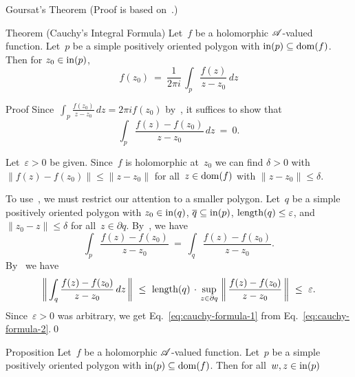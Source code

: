 \documentclass[a]{subfiles}
\begin{document}
\begin{parsec}
\begin{point}[goursat]{Goursat's Theorem}
(Proof is based on~\cite{moore1900}.)
\end{point}%
\begin{point}{Theorem (Cauchy's Integral Formula)}%
Let~$f$ be a holomorphic $\mathscr{A}$-valued function.
Let~$p$ be a simple positively oriented 
polygon with $\operatorname{in}(p)\subseteq\operatorname{dom}(f)$.
Then for $z_0\in \operatorname{in}(p)$,
\begin{equation*}
f(z_0)\ = \ \frac{1}{2\pi i}\,\int_p \frac{f(z)}{z-z_0}\,dz
\end{equation*}
\begin{point}{Proof}%
Since~$\int_p \frac{f(z_0)}{z-z_0}\,dz
= 2\pi i f(z_0)$ by~,
it suffices to show that
\begin{equation}
\label{eq:cauchy-formula-1}
\int_p \frac{f(z)-f(z_0)}{z-z_0}\,dz \ = \ 0.
\end{equation}
\begin{point}%
Let~$\varepsilon>0$ be given.
Since~$f$ is holomorphic at~$z_0$
we can find $\delta>0$ with
$\|f(z)-f(z_0)\|\leq \|z-z_0\|$
for all~$z\in\operatorname{dom}(f)$ with $\|z-z_0\|\leq \delta$. 
\end{point}
\begin{point}%
To use~,
we must restrict our attention to a smaller polygon.
Let~$q$ be a simple positively oriented polygon 
with $z_0\in \operatorname{in}(q)$,  $\overline{q}\subseteq \operatorname{in}(p)$,
$\operatorname{length}(q)\leq \varepsilon$,
and $\|z_0-z\|\leq \delta$ for all~$z\in \partial q$.
By~, we have
\begin{equation}
\label{eq:cauchy-formula-2}
\int_p \frac{f(z)-f(z_0)}{z-z_0}
\ = \ 
\int_q \frac{f(z)-f(z_0)}{z-z_0}.
\end{equation}
By~
we have
\begin{equation*}
\left\|\,\int_q \frac{f(z)-f(z_0)}{z-z_0}\,dz\,\right\|
\ \leq \ \operatorname{length}(q)\,\cdot\,
\sup_{z\in\partial q} \,\left\|\,\frac{f(z)-f(z_0)}{z-z_0}\,\right\|
\ \leq \ \varepsilon.
\end{equation*}
Since~$\varepsilon>0$ was arbitrary,
we get Eq.~\eqref{eq:cauchy-formula-1}
from Eq.~\eqref{eq:cauchy-formula-2}.\qed
\end{point}
\end{point}
\end{point}
\begin{point}[taylor]{Proposition}%
Let~$f$ be a holomorphic $\mathscr{A}$-valued function.
Let~$p$ be a simple positively oriented polygon 
with $\operatorname{in}(p) \subseteq \operatorname{dom}(f)$.
Then for all~$w,z\in \operatorname{in}(p)$

\end{point}
\end{parsec}
\end{document}
